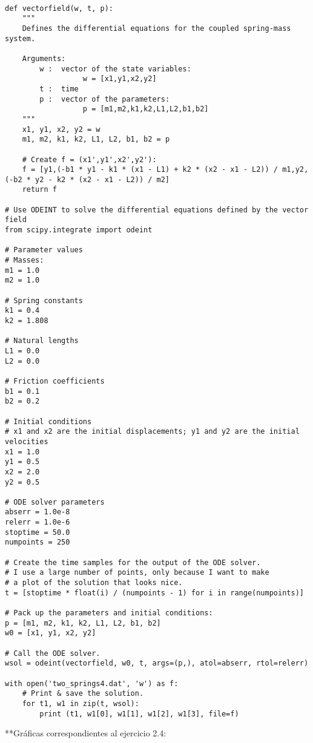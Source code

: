 \documentclass{article} %
\begin{document}
\begin{verbatim} 

def vectorfield(w, t, p):
    """
    Defines the differential equations for the coupled spring-mass system.

    Arguments:
        w :  vector of the state variables:
                  w = [x1,y1,x2,y2]
        t :  time
        p :  vector of the parameters:
                  p = [m1,m2,k1,k2,L1,L2,b1,b2]
    """
    x1, y1, x2, y2 = w
    m1, m2, k1, k2, L1, L2, b1, b2 = p

    # Create f = (x1',y1',x2',y2'):
    f = [y1,(-b1 * y1 - k1 * (x1 - L1) + k2 * (x2 - x1 - L2)) / m1,y2,(-b2 * y2 - k2 * (x2 - x1 - L2)) / m2]
    return f

# Use ODEINT to solve the differential equations defined by the vector field
from scipy.integrate import odeint

# Parameter values
# Masses:
m1 = 1.0
m2 = 1.0

# Spring constants
k1 = 0.4
k2 = 1.808

# Natural lengths
L1 = 0.0
L2 = 0.0

# Friction coefficients
b1 = 0.1
b2 = 0.2

# Initial conditions
# x1 and x2 are the initial displacements; y1 and y2 are the initial velocities
x1 = 1.0
y1 = 0.5
x2 = 2.0
y2 = 0.5

# ODE solver parameters
abserr = 1.0e-8
relerr = 1.0e-6
stoptime = 50.0
numpoints = 250

# Create the time samples for the output of the ODE solver.
# I use a large number of points, only because I want to make
# a plot of the solution that looks nice.
t = [stoptime * float(i) / (numpoints - 1) for i in range(numpoints)]

# Pack up the parameters and initial conditions:
p = [m1, m2, k1, k2, L1, L2, b1, b2]
w0 = [x1, y1, x2, y2]

# Call the ODE solver.
wsol = odeint(vectorfield, w0, t, args=(p,), atol=abserr, rtol=relerr)

with open('two_springs4.dat', 'w') as f:
    # Print & save the solution.
    for t1, w1 in zip(t, wsol):
        print (t1, w1[0], w1[1], w1[2], w1[3], file=f) 

\end{verbatim}


**Gráficas correspondientes al ejercicio 2.4:
\end{document}
